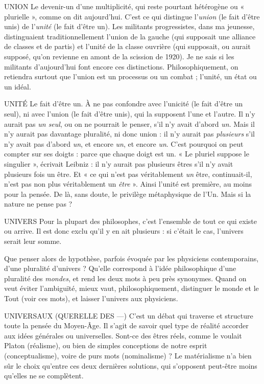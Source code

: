 UNION Le devenir-un d’une multiplicité, qui reste pourtant hétérogène ou
« plurielle », comme on dit aujourd’hui. C’est ce qui distingue
l'{\it union} (le fait d’être unis) de l’{\it unité} (le fait d’être un). Les militants progressistes,
dans ma jeunesse, distinguaient traditionnellement l’union de la gauche
(qui supposait une alliance de classes et de partis) et l’unité de la classe ouvrière
(qui supposait, ou aurait supposé, qu’on revienne en amont de la scission de
1920). Je ne sais si les militants d’aujourd’hui font encore ces distinctions. Philosophiquement,
on retiendra surtout que l’union est un processus ou un
combat ; l’unité, un état ou un idéal.

UNITÉ Le fait d’être un. À ne pas confondre avec l’unicité (le fait d’être un
seul), ni avec l’union (le fait d’être unis), qui la supposent l’une et
l’autre. Il n’y aurait pas {\it un seul}, ou on ne pourrait le penser, s’il n’y avait
d’abord {\it un}. Mais il n’y aurait pas davantage pluralité, ni donc union : il n’y
aurait pas {\it plusieurs} s’il n’y avait pas d’abord {\it un}, et encore {\it un}, et encore {\it un}.
C’est pourquoi on peut compter sur ses doigts : parce que chaque doigt est un.
« Le pluriel suppose le singulier », écrivait Leibniz : il n’y aurait pas plusieurs
êtres s’il n’y avait plusieurs fois un être. Et « ce qui n’est pas véritablement {\it un}
être, continuait-il, n’est pas non plus véritablement un {\it être} ». Ainsi l’unité est
première, au moins pour la pensée. De là, sans doute, le privilège métaphysique
de l’Un. Mais si la nature ne pense pas ?

UNIVERS Pour la plupart des philosophes, c’est l’ensemble de tout ce qui
existe ou arrive. Il est donc exclu qu’il y en ait plusieurs : si c’était
le cas, l’univers serait leur somme.

Que penser alors de hypothèse, parfois évoquée par les physiciens contemporains,
d’une pluralité d’univers ? Qu’elle correspond à l’idée philosophique
d’une pluralité des {\it mondes}, et rend les deux mots à peu près synonymes. Quand
on veut éviter l'ambiguïté, mieux vaut, philosophiquement, distinguer le
monde et le Tout (voir ces mots), et laisser l’univers aux physiciens.

UNIVERSAUX (QUERELLE DES —) C’est un débat qui traverse et structure
toute la pensée du Moyen-Âge. Il
s’agit de savoir quel type de réalité accorder aux idées générales ou universelles.
Sont-ce des êtres réels, comme le voulait Platon (réalisme), ou bien de simples
conceptions de notre esprit (conceptualisme), voire de purs mots (nominalisme) ?
Le matérialisme n’a bien sûr le choix qu’entre ces deux dernières solutions,
qui s'opposent peut-être moins qu’elles ne se complètent.


